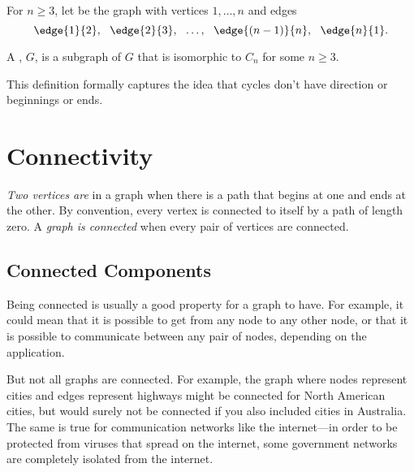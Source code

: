 \begin{definition}
  For $n \ge 3$, let  be the graph with vertices $1,\dots, n$
  and edges
\[
\edge{1}{2},\ \ \edge{2}{3},\ \ \dots,\ \ \edge{(n-1)}{n},\ \ \edge{n}{1}.
\]

\iffalse
A graph is a \term{cycle} of length $n$ iff it is isomorphic to $C_n$
for some $n \ge 3$.
\fi

A , $G$, is a subgraph of $G$ that is
isomorphic to $C_n$ for some $n \ge 3$.
\end{definition}

This definition formally captures the idea that cycles don't
have direction or beginnings or ends.

\begin{problems}
\homeworkproblems
{}
\end{problems}


\section{Connectivity}\label{connect-sec}

\begin{definition}\label{def:connected-vertices} %
  \emph{Two vertices are}  in a graph when there is a
  path that begins at one and ends at the other.  By convention, every
  vertex is connected to itself by a path of length zero.  A
  \emph{graph is connected} when every pair of vertices are connected.
\end{definition}


\subsection{Connected Components}

Being connected is usually a good property for a graph to have.  For
example, it could mean that it is possible to get from any node to any
other node, or that it is possible to communicate between any pair of
nodes, depending on the application.

But not all graphs are connected.  For example, the graph where nodes
represent cities and edges represent highways might be connected for
North American cities, but would surely not be connected if you also
included cities in Australia.  The same is true for communication
networks like the internet---in order to be protected from viruses
that spread on the internet, some government networks are completely
isolated from the internet.

